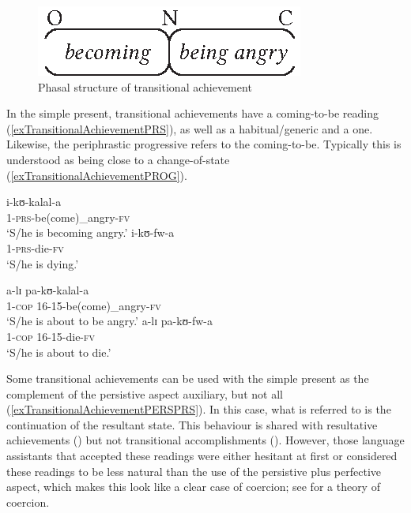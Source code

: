 \begin{figure}[h]
\begin{center}
\includegraphics{figures/GrafikTransitionalAchievement.eps}
\caption{Phasal structure of transitional achievement}
\label{FigureTransitionalAchievement}
\end{center}
\end{figure}

In the simple present, transitional achievements have a coming-to-be reading (\ref{exTransitionalAchievementPRS}), as well as a habitual/generic and a  one. Likewise, the periphrastic progressive refers to the coming-to-be. Typically this is understood as being close to a change-of-state (\ref{exTransitionalAchievementPROG}).
\begin{exe}
\begin{multicols}{2}
\ex\label{exTransitionalAchievementPRS} \begin{xlist}
\ex \gll i-kʊ-kalal-a\\
1-\textsc{prs}-be(come)\_angry-\textsc{fv} \phantom{16-15}\\
\glt `S/he is becoming angry.'
\ex \gll i-kʊ-fw-a\\
1-\textsc{prs}-die-\textsc{fv}\\
\glt `S/he is dying.'
\end{xlist}
\columnbreak
\ex\label{exTransitionalAchievementPROG} \begin{xlist}
\ex \gll a-lɪ pa-kʊ-kalal-a\\
1-\textsc{cop} 16-15-be(come)\_angry-\textsc{fv}\\
\glt `S/he is about to be angry.'
\ex \gll a-lɪ pa-kʊ-fw-a\\
1-\textsc{cop} 16-15-die-\textsc{fv}\\
\glt `S/he is about to die.'
\end{xlist}
\end{multicols} 
\end{exe}%

Some transitional achievements can be used with the simple present as the complement of the persistive aspect auxiliary, but not all (\ref{exTransitionalAchievementPERSPRS}). In this case, what is referred to is the continuation of the resultant state. This behaviour is shared with resultative achievements () but not transitional accomplishments (). However, those language assistants that accepted these readings were either hesitant at first or considered these readings to be less natural than the use of the persistive plus perfective aspect, which makes this look like a clear case of coercion; see \citet{MichaelisL2004} for a theory of coercion.

